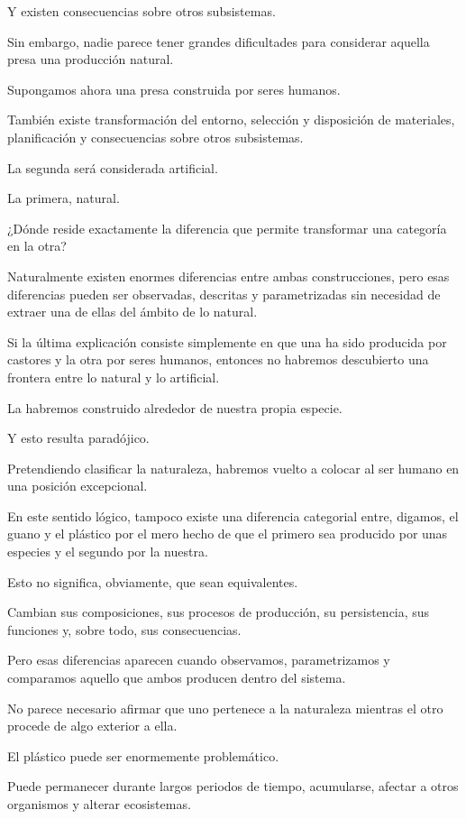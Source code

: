 \documentclass[12pt,a4paper]{article}
\begin{document}
Y existen consecuencias sobre otros subsistemas.

Sin embargo, nadie parece tener grandes dificultades para considerar aquella presa una producción natural.

Supongamos ahora una presa construida por seres humanos.

También existe transformación del entorno, selección y disposición de materiales, planificación y consecuencias sobre otros subsistemas.

La segunda será considerada artificial.

La primera, natural.

¿Dónde reside exactamente la diferencia que permite transformar una categoría en la otra?

Naturalmente existen enormes diferencias entre ambas construcciones, pero esas diferencias pueden ser observadas, descritas y parametrizadas sin necesidad de extraer una de ellas del ámbito de lo natural.

Si la última explicación consiste simplemente en que una ha sido producida por castores y la otra por seres humanos, entonces no habremos descubierto una frontera entre lo natural y lo artificial.

La habremos construido alrededor de nuestra propia especie.

Y esto resulta paradójico.

Pretendiendo clasificar la naturaleza, habremos vuelto a colocar al ser humano en una posición excepcional.

En este sentido lógico, tampoco existe una diferencia categorial entre, digamos, el guano y el plástico por el mero hecho de que el primero sea producido por unas especies y el segundo por la nuestra.

Esto no significa, obviamente, que sean equivalentes.

Cambian sus composiciones, sus procesos de producción, su persistencia, sus funciones y, sobre todo, sus consecuencias.

Pero esas diferencias aparecen cuando observamos, parametrizamos y comparamos aquello que ambos producen dentro del sistema.

No parece necesario afirmar que uno pertenece a la naturaleza mientras el otro procede de algo exterior a ella.

El plástico puede ser enormemente problemático.

Puede permanecer durante largos periodos de tiempo, acumularse, afectar a otros organismos y alterar ecosistemas.
\end{document}
